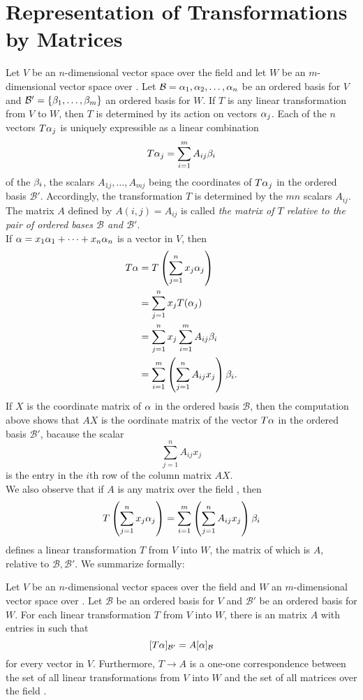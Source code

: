 \documentclass{mynotes}
\begin{document}
\section{Representation of Transformations by Matrices}
Let $V$ be an $n$-dimensional vector space over the field \F and let $W$ be an $m$-dimensional vector space over \F. Let $\mathcal{B} = {\alpha_1,\alpha_2,\ldots,\alpha_n}$ be an ordered basis for $V$ and $\mathcal{B}'=\{\beta_1,\ldots,\beta_m\}$ an ordered basis for $W$. If $T$ is any linear transformation from $V$ to $W$, then $T$ is determined by its action on vectors $\alpha_j$. Each of the $n$ vectors $T\alpha_j$ is uniquely expressible as a linear combination $$T\alpha_j=\sum_{i=1}^{m}A_{ij}\beta_i$$of the $\beta_i$, the scalars $A_{1j},\ldots,A_{mj}$ being the coordinates of $T\alpha_j$ in the ordered basis $\mathcal{B}'$. Accordingly, the transformation $T$ is determined by the $mn$ scalars $A_{ij}$. The \mbyn matrix $A$ defined by $A(i,j)=A_{ij}$ is called \emph{the matrix of $T$ relative to the pair of ordered bases $\mathcal{B}$ and $\mathcal{B}'$}.\\
If $\alpha=x_1\alpha_1+\cdots+x_n\alpha_n$ is a vector in $V$, then
\begin{align*}
T\alpha &= T\left(\sum_{j=1}^nx_j\alpha_j\right) \\&=\sum_{j=1}^nx_jT(\alpha_j)\\&=\sum_{j=1}^nx_j\sum_{i=1}^mA_{ij}\beta_i \\&= \sum_{i=1}^m\left(\sum_{j=1}^nA_{ij}x_j\right)\beta_i.
\end{align*}
If $X$ is the coordinate matrix of $\alpha$ in the ordered basis $\mathcal{B}$, then the computation above shows that $AX$ is the oordinate matrix of the vector $T\alpha$ in the ordered basis $\mathcal{B}'$, bacause the scalar$$\sum_{j=1}^nA_{ij}x_j$$is the entry in the $i$th row of the column matrix $AX$.\\
We also observe that if $A$ is any \mbyn{} matrix over the field \F, then $$T\left(\sum_{j=1}^nx_j\alpha_j\right)=\sum_{i=1}^m\left(\sum_{j=1}^nA_{ij}x_j\right)\beta_i$$defines a linear transformation $T$ from $V$ into $W$, the matrix of which is $A$, relative to $\mathcal{B},\mathcal{B}'$. We summarize formally:
\begin{theorem}\label{ATT}
Let $V$ be an $n$-dimensional vector spaces over the field \F and $W$ an $m$-dimensional vector space over \F. Let $\mathcal{B}$ be an ordered basis for $V$ and $\mathcal{B}'$ be an ordered basis for $W$. For each linear transformation $T$ from $V$ into $W$, there is an \mbyn{} matrix $A$ with entries in \F{} such that$$[T\alpha]_{\mathcal{B}'}=A[\alpha]_{\mathcal{B}}$$for every vector \al{} in $V$. Furthermore, $T\rightarrow A$ is a one-one correspondence between the set of all linear transformations from $V$ into $W$ and the set of all \mbyn{} matrices over the field \F. 
\end{theorem}
\end{document}
